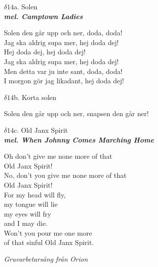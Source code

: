 \documentclass[a6paper,10pt]{article}
\newcommand{\mel}[1]{\small\textbf{\textit{mel. #1 \\}}}
\begin{document}
\setlength{\oddsidemargin}{-0.37in}
\noindent
\begin{center}
\Large $\delta14$a. Solen\\ 
\mel{Camptown Ladies}
\end{center}
Solen den går upp och ner, doda, doda! \\
Jag ska aldrig supa mer, hej doda dej! \\
Hej doda dej, hej doda dej! \\
Jag ska aldrig supa mer, hej doda dej! 
\vspace{5pt} \\
Men detta var ju inte sant, doda, doda! \\
I morgon gör jag likadant, hej doda dej! 
\vspace{10pt}
\begin{center}
\Large $\delta14$b. Korta solen\\ 
\end{center}
Solen den går upp och ner, snapsen den går ner!
\vspace{25pt}
\begin{center}
\Large $\delta14$c. Old Janx Spirit\\ 
\mel{When Johnny Comes Marching Home}
\end{center}
Oh don't give me none more of that \\
Old Janx Spirit! \\
No, don't you give me none more of that \\
Old Janx Spirit! \\
For my head will fly, \\
my tongue will lie \\
my eyes will fry \\
and I may die. \\
Won't you pour me one more \\
of that sinful Old Janx Spirit. 
\begin{flushright}
\textit{Gruvarbetarsång från Orion}
\end{flushright}
\end{document}
